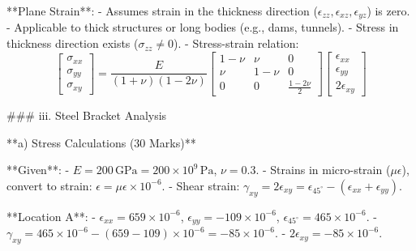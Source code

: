 **Plane Strain**:
- Assumes strain in the thickness direction (\( \epsilon_{zz}, \epsilon_{xz}, \epsilon_{yz} \)) is zero.
- Applicable to thick structures or long bodies (e.g., dams, tunnels).
- Stress in thickness direction exists (\( \sigma_{zz} \neq 0 \)).
- Stress-strain relation:
\[
\begin{bmatrix} \sigma_{xx} \\ \sigma_{yy} \\ \sigma_{xy} \end{bmatrix} = \frac{E}{(1 + \nu)(1 - 2\nu)} \begin{bmatrix} 1 - \nu & \nu & 0 \\ \nu & 1 - \nu & 0 \\ 0 & 0 & \frac{1 - 2\nu}{2} \end{bmatrix} \begin{bmatrix} \epsilon_{xx} \\ \epsilon_{yy} \\ 2 \epsilon_{xy} \end{bmatrix}
\]

### iii. Steel Bracket Analysis

**a) Stress Calculations (30 Marks)**

**Given**:
- \( E = 200 \, \text{GPa} = 200 \times 10^9 \, \text{Pa} \), \( \nu = 0.3 \).
- Strains in micro-strain (\( \mu\epsilon \)), convert to strain: \( \epsilon = \mu\epsilon \times 10^{-6} \).
- Shear strain: \( \gamma_{xy} = 2 \epsilon_{xy} = \epsilon_{45^\circ} - (\epsilon_{xx} + \epsilon_{yy}) \).

**Location A**:
- \( \epsilon_{xx} = 659 \times 10^{-6} \), \( \epsilon_{yy} = -109 \times 10^{-6} \), \( \epsilon_{45^\circ} = 465 \times 10^{-6} \).
- \( \gamma_{xy} = 465 \times 10^{-6} - (659 - 109) \times 10^{-6} = -85 \times 10^{-6} \).
- \( 2 \epsilon_{xy} = -85 \times 10^{-6} \).

